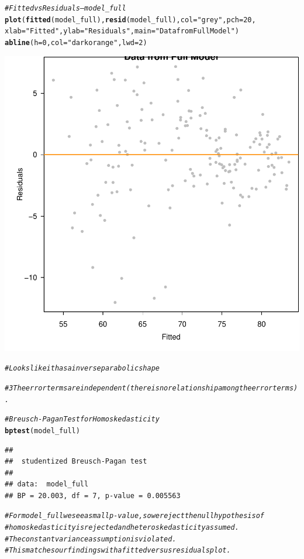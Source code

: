 \documentclass{article}\usepackage[]{graphicx}\usepackage[]{color}
\makeatletter
\newcommand{\hlnum}[1]{\textcolor[rgb]{0.686,0.059,0.569}{#1}}%
\newcommand{\hlstr}[1]{\textcolor[rgb]{0.192,0.494,0.8}{#1}}%
\newcommand{\hlcom}[1]{\textcolor[rgb]{0.678,0.584,0.686}{\textit{#1}}}%
\newcommand{\hlstd}[1]{\textcolor[rgb]{0.345,0.345,0.345}{#1}}%
\newcommand{\hlkwc}[1]{\textcolor[rgb]{0.333,0.667,0.333}{#1}}%
\newcommand{\hlkwd}[1]{\textcolor[rgb]{0.737,0.353,0.396}{\textbf{#1}}}%
\newenvironment{kframe}{%
 \def\at@end@of@kframe{}%
 \ifinner\ifhmode%
  \def\at@end@of@kframe{\end{minipage}}%
  \begin{minipage}{\columnwidth}%
 \fi\fi%
 \def\FrameCommand##1{\hskip\@totalleftmargin \hskip-\fboxsep
 \colorbox{shadecolor}{##1}\hskip-\fboxsep
     \hskip-\linewidth \hskip-\@totalleftmargin \hskip\columnwidth}%
 \MakeFramed {\advance\hsize-\width
   \@totalleftmargin\z@ \linewidth\hsize
   \@setminipage}}%
 {\par\unskip\endMakeFramed%
 \at@end@of@kframe}
\newenvironment{knitrout}{}{} %
\makeatother
\begin{document}
\begin{knitrout}
\begin{kframe}
\begin{alltt}
\hlcom{# Fitted vs Residuals --- model_full}
\hlkwd{plot}\hlstd{(}\hlkwd{fitted}\hlstd{(model_full),} \hlkwd{resid}\hlstd{(model_full),} \hlkwc{col} \hlstd{=} \hlstr{"grey"}\hlstd{,} \hlkwc{pch} \hlstd{=} \hlnum{20}\hlstd{,}
     \hlkwc{xlab} \hlstd{=} \hlstr{"Fitted"}\hlstd{,} \hlkwc{ylab} \hlstd{=} \hlstr{"Residuals"}\hlstd{,} \hlkwc{main} \hlstd{=} \hlstr{"Data from Full Model"}\hlstd{)}
\hlkwd{abline}\hlstd{(}\hlkwc{h} \hlstd{=} \hlnum{0}\hlstd{,} \hlkwc{col} \hlstd{=} \hlstr{"darkorange"}\hlstd{,} \hlkwc{lwd} \hlstd{=} \hlnum{2}\hlstd{)}
\end{alltt}
\end{kframe}

{\centering \includegraphics[width=.6\linewidth]{figure/Analysis-Rnwauto-report-21} 

}


\begin{kframe}\begin{alltt}
\hlcom{# Looks like it has a inverse parabolic shape}


\hlcom{# 3 The error terms are independent (there is no relationship among the error terms).}

\hlcom{# Breusch-Pagan Test for Homoskedasticity}
\hlkwd{bptest}\hlstd{(model_full)}
\end{alltt}
\begin{verbatim}
## 
## 	studentized Breusch-Pagan test
## 
## data:  model_full
## BP = 20.003, df = 7, p-value = 0.005563
\end{verbatim}
\begin{alltt}
\hlcom{# For model_full we see a small p-value, so we reject the null hypothesis of }
\hlcom{#     homoskedasticity is rejected and heteroskedasticity assumed.}
\hlcom{# The constant variance assumption is violated. }
\hlcom{# This matches our findings with a fitted versus residuals plot.}


\end{alltt}
\end{kframe}
\end{knitrout}
\end{document}
